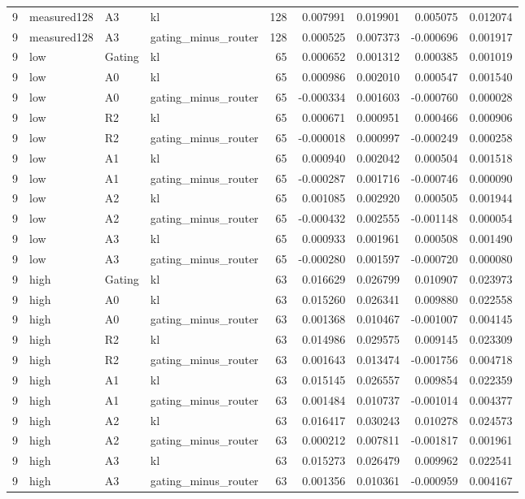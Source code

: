 \begin{tabular}{rlllrrrrr}
9 & measured128 & A3 & kl & 128 & 0.007991 & 0.019901 & 0.005075 & 0.012074 \\
9 & measured128 & A3 & gating_minus_router & 128 & 0.000525 & 0.007373 & -0.000696 & 0.001917 \\
9 & low & Gating & kl & 65 & 0.000652 & 0.001312 & 0.000385 & 0.001019 \\
9 & low & A0 & kl & 65 & 0.000986 & 0.002010 & 0.000547 & 0.001540 \\
9 & low & A0 & gating_minus_router & 65 & -0.000334 & 0.001603 & -0.000760 & 0.000028 \\
9 & low & R2 & kl & 65 & 0.000671 & 0.000951 & 0.000466 & 0.000906 \\
9 & low & R2 & gating_minus_router & 65 & -0.000018 & 0.000997 & -0.000249 & 0.000258 \\
9 & low & A1 & kl & 65 & 0.000940 & 0.002042 & 0.000504 & 0.001518 \\
9 & low & A1 & gating_minus_router & 65 & -0.000287 & 0.001716 & -0.000746 & 0.000090 \\
9 & low & A2 & kl & 65 & 0.001085 & 0.002920 & 0.000505 & 0.001944 \\
9 & low & A2 & gating_minus_router & 65 & -0.000432 & 0.002555 & -0.001148 & 0.000054 \\
9 & low & A3 & kl & 65 & 0.000933 & 0.001961 & 0.000508 & 0.001490 \\
9 & low & A3 & gating_minus_router & 65 & -0.000280 & 0.001597 & -0.000720 & 0.000080 \\
9 & high & Gating & kl & 63 & 0.016629 & 0.026799 & 0.010907 & 0.023973 \\
9 & high & A0 & kl & 63 & 0.015260 & 0.026341 & 0.009880 & 0.022558 \\
9 & high & A0 & gating_minus_router & 63 & 0.001368 & 0.010467 & -0.001007 & 0.004145 \\
9 & high & R2 & kl & 63 & 0.014986 & 0.029575 & 0.009145 & 0.023309 \\
9 & high & R2 & gating_minus_router & 63 & 0.001643 & 0.013474 & -0.001756 & 0.004718 \\
9 & high & A1 & kl & 63 & 0.015145 & 0.026557 & 0.009854 & 0.022359 \\
9 & high & A1 & gating_minus_router & 63 & 0.001484 & 0.010737 & -0.001014 & 0.004377 \\
9 & high & A2 & kl & 63 & 0.016417 & 0.030243 & 0.010278 & 0.024573 \\
9 & high & A2 & gating_minus_router & 63 & 0.000212 & 0.007811 & -0.001817 & 0.001961 \\
9 & high & A3 & kl & 63 & 0.015273 & 0.026479 & 0.009962 & 0.022541 \\
9 & high & A3 & gating_minus_router & 63 & 0.001356 & 0.010361 & -0.000959 & 0.004167 \\
\bottomrule
\end{tabular}
